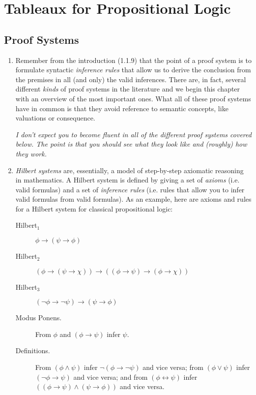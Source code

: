 \chapter{Tableaux for Propositional Logic}

\section{Proof Systems}

\begin{enumerate}[\thesection.1]

		\item Remember from the introduction (1.1.9) that the point of a proof system is to formulate syntactic \emph{inference rules} that allow us to derive the conclusion from the premises in all (and only) the valid inferences. There are, in fact, several different \emph{kinds} of proof systems in the literature and we begin this chapter with an overview of the most important ones. What all of these proof systems have in common is that they avoid reference to semantic concepts, like valuations or consequence.
		
		\emph{I don't expect you to become fluent in all of the different proof systems covered below. The point is that you should see what they look like and (roughly) how they work.}
		
		\item \emph{Hilbert systems} are, essentially, a model of step-by-step axiomatic reasoning in mathematics. A Hilbert system is defined by giving a set of \emph{axioms} (i.e. valid formulas) and a set of \emph{inference rules} (i.e. rules that allow you to infer valid formulas from valid formulas). As an example, here are axioms and rules for a Hilbert system for classical propositional logic:		
		 \begin{description}

						\item[Hilbert$_1$] $\phi\to (\psi\to \phi)$

						\item[Hilbert$_2$] $(\phi\to (\psi\to \chi))\to((\phi\to \psi)\to (\phi\to \chi))$

						\item[Hilbert$_3$] $(\neg \phi\to \neg \psi)\to (\psi\to\phi)$				
						
						\item[Modus Ponens.] From $\phi$ and $(\phi\to\psi)$ infer $\psi$.
						
						\item[Definitions.] From $(\phi\land\psi)$ infer $\neg(\phi\to\neg\psi)$ and vice versa; from $(\phi\lor\psi)$ infer  $(\neg\phi\to\psi)$ and vice versa; and from $(\phi\leftrightarrow\psi)$ infer $((\phi\to\psi)\land(\psi\to\phi))$ and vice versa.


\end{description}
\end{enumerate}
